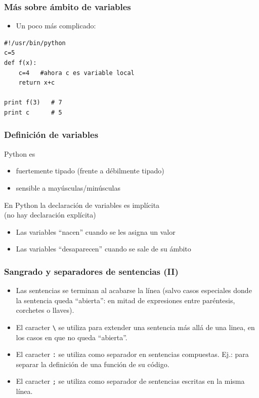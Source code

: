 \documentclass{beamer}
\begin{document}
\begin{frame}[fragile]
\frametitle{Más sobre ámbito de variables}
\begin{itemize}
  
\item  Un poco más complicado:

\end{itemize}


  \begin{footnotesize}
\begin{verbatim}
#!/usr/bin/python
c=5
def f(x):
    c=4   #ahora c es variable local
    return x+c
    
print f(3)   # 7
print c      # 5

\end{verbatim}
  \end{footnotesize}

\end{frame}




\begin{frame}
\frametitle{Definición de variables}

Python es
\begin{itemize}
\item fuertemente tipado (frente a débilmente tipado)
\item sensible a mayúsculas/minúsculas
\end{itemize}



En Python la declaración de variables es implícita \\(no hay declaración explícita)
\begin{itemize}
\item Las variables ``nacen'' cuando se les asigna un valor
\item Las variables ``desaparecen'' cuando se sale de su ámbito
\end{itemize}  
\end{frame}


\begin{frame}[fragile]
\frametitle{Sangrado y separadores de sentencias (II)}

\begin{itemize}
\item Las sentencias se terminan al acabarse la línea (salvo casos
  especiales donde la sentencia queda ``abierta'': en mitad de
  expresiones entre paréntesis, corchetes o llaves).
  
\item El caracter \verb|\| se utiliza para extender una sentencia más
  allá de una linea, en los casos en que no queda ``abierta''. 

\item El caracter \verb|:| se utiliza como separador en sentencias
  compuestas. Ej.: para separar la definición de una función de su
  código.
  
\item El caracter \verb|;| se utiliza como separador de sentencias
  escritas en la misma línea.

\end{itemize}
\end{frame}
\end{document}
